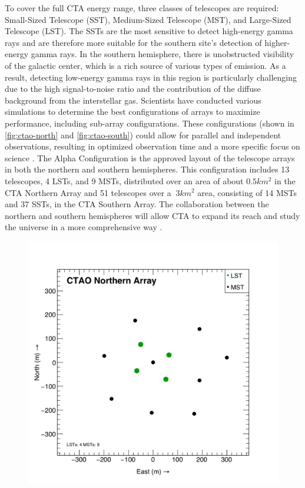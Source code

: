 To cover the full CTA energy range, three classes of telescopes are required: Small-Sized Telescope (SST), Medium-Sized Telescope (MST), and Large-Sized Telescope (LST). The SSTs are the most sensitive to detect high-energy gamma rays and are therefore more suitable for the southern site's detection of higher-energy gamma rays. In the southern hemisphere, there is unobstructed visibility of the galactic center, which is a rich source of various types of emission. As a result, detecting low-energy gamma rays in this region is particularly challenging due to the high signal-to-noise ratio and the contribution of the diffuse background from the interstellar gas.  Scientists have conducted various simulations to determine the best configurations of arrays to maximize performance, including sub-array configurations. These configurations (shown in \autoref{fig:ctao-north} and \autoref{fig:ctao-south}) could allow for parallel and independent observations, resulting in optimized observation time and a more specific focus on science \cite{Acharyya201935}. The Alpha Configuration is the approved layout of the telescope arrays in both the northern and southern hemispheres. This configuration includes 13 telescopes, 4 LSTs, and 9 MSTs, distributed over an area of about $0.5 km^2$ in the CTA Northern Array and 51 telescopes over a $~3 km^2$ area, consisting of 14 MSTs and 37 SSTs, in the CTA Southern Array. The collaboration between the northern and southern hemispheres will allow CTA to expand its reach and study the universe in a more comprehensive way \cite{Acharyya201935}. 
\begin{figure}[ht]
\centering
\includegraphics[width=0.8\linewidth]{figures/introduction/ctao-north.png}
\label{fig:ctao-north}
\end{figure}
